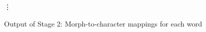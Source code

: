 \begin{figure}[t]
\begin{mdframed}
\begin{tabbing}
 \vdots \> \\
\end{tabbing}
\vspace{-0.4cm}
\label{fig:m2c-for-each-word}
\caption{Output of Stage 2: Morph-to-character mappings for each word}
\end{mdframed}
\end{figure}








